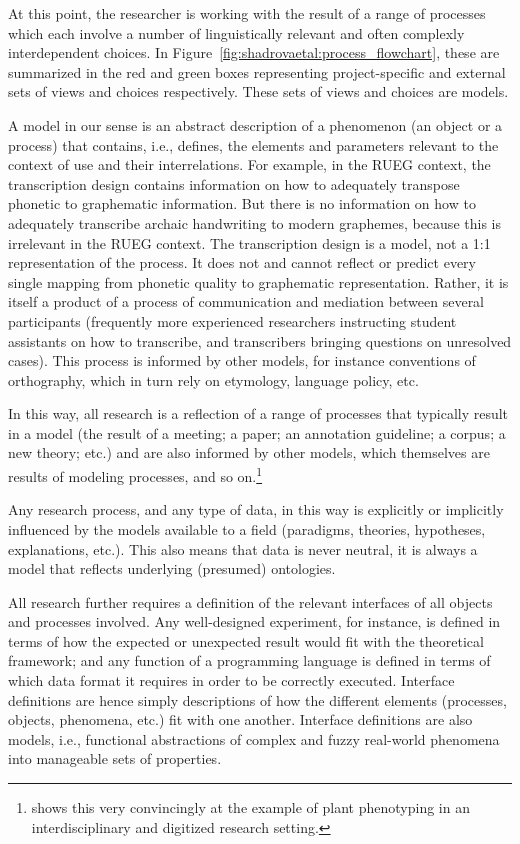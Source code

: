 \documentclass[output=paper,colorlinks,citecolor=brown]{langscibook}
\begin{document}
At this point, the researcher is working with the result of a range of processes which each involve a number of linguistically relevant and often complexly interdependent choices. In Figure~\ref{fig:shadrovaetal:process_flowchart}, these are summarized in the red and green boxes representing project-specific and external sets of views and choices respectively. These sets of views and choices are models. 

A model in our sense is an abstract description of a phenomenon (an object or a process) that contains, i.e., defines, the elements and parameters relevant to the context of use and their interrelations. For example, in the RUEG context, the transcription design contains information on how to adequately transpose phonetic to graphematic information. But there is no information on how to adequately transcribe archaic handwriting to modern graphemes, because this is irrelevant in the RUEG context. The transcription design is a model, not a 1:1 representation of the process. It does not and cannot reflect or predict every single mapping from phonetic quality to graphematic representation. Rather, it is itself a product of a process of communication and mediation between several participants (frequently more experienced researchers instructing student assistants on how to transcribe, and transcribers bringing questions on unresolved cases). This process is informed by other models, for instance conventions of orthography, which in turn rely on etymology, language policy, etc.

In this way, all research is a reflection of a range of processes that typically result in a model (the result of a meeting; a paper; an annotation guideline; a corpus; a new theory; etc.) and are also informed by other models, which themselves are results of modeling processes, and so on.\footnote{\textcite{leonelli2019} shows this very convincingly at the example of plant phenotyping in an interdisciplinary and digitized research setting.} 

Any research process, and any type of data, in this way is explicitly or implicitly influenced by the models available to a field (paradigms, theories, hypotheses, explanations, etc.). This also means that data is never neutral, it is always a model that reflects underlying (presumed) ontologies.

All research further requires a definition of the relevant interfaces of all objects and processes involved. Any well-designed experiment, for instance, is defined in terms of how the expected or unexpected result would fit with the theoretical framework; and any function of a programming language is defined in terms of which data format it requires in order to be correctly executed. Interface definitions are hence simply descriptions of how the different elements (processes, objects, phenomena, etc.) fit with one another. Interface definitions are also models, i.e., functional abstractions of complex and fuzzy real-world phenomena into manageable sets of properties.
\end{document}
